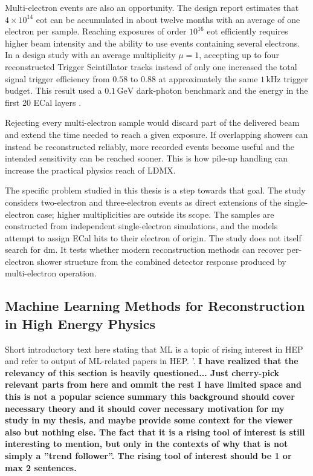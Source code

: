 Multi-electron events are also an opportunity. The design report estimates
that \(4\times10^{14}\) \gls{eot} can be accumulated in about twelve months
with an average of one electron per sample. Reaching exposures of order
\(10^{16}\) \gls{eot} efficiently requires higher beam intensity and the
ability to use events containing several electrons. In a design study with
an average multiplicity \(\mu=1\), accepting up to four reconstructed
Trigger Scintillator tracks instead of only one increased the total signal
trigger efficiency from \(0.58\) to \(0.88\) at approximately the same
\(1\,\mathrm{kHz}\) trigger budget. This result used a
\(0.1\,\mathrm{GeV}\) dark-photon benchmark and the energy in the first 20
ECal layers \cite{ldmx2025-overview}.


Rejecting every multi-electron sample would discard part of the delivered
beam and extend the time needed to reach a given exposure. If overlapping
showers can instead be reconstructed reliably, more recorded events become
useful and the intended sensitivity can be reached sooner. This is how
pile-up handling can increase the practical physics reach of LDMX.

The specific problem studied in this thesis is a step towards that goal. The
study considers two-electron and three-electron events as direct extensions
of the single-electron case; higher multiplicities are outside its scope. The
samples are constructed from independent single-electron simulations, and
the models attempt to assign ECal hits to their electron of origin. The study
does not itself search for \gls{dm}. It tests whether modern reconstruction
methods can recover per-electron shower structure from the combined detector
response produced by multi-electron operation.



\subsection{Machine Learning Methods for Reconstruction in High Energy Physics}
\label{sec:ml_event_reconstruction_hep}


Short introductory text here stating that ML is a topic of rising interest in HEP and refer to output of ML-related papers in HEP. \cite{iml-wg-hepml-livingreview}'. \textbf{I have realized that the relevancy of this section is heavily questioned... Just cherry-pick relevant parts from here and ommit the rest I have limited space and this is not a popular science summary this background should cover necessary theory and it should cover necessary motivation for my study in my thesis, and maybe provide some context for the viewer also but nothing else. The fact that it is a rising tool of interest is still interesting to mention, but only in the contexts of why that is not simply a ''trend follower''. The rising tool of interest should be 1 or max 2 sentences.}


